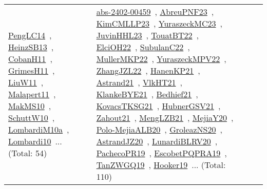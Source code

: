 {\begin{longtable}{lp{3cm}>{\raggedright\arraybackslash}p{6cm}>{\raggedright\arraybackslash}p{6cm}>{\raggedright\arraybackslash}p{8cm}}
\href{../works/PengLC14.pdf}{PengLC14}~\cite{PengLC14}, \href{../works/HeinzSB13.pdf}{HeinzSB13}~\cite{HeinzSB13}, \href{../works/CobanH11.pdf}{CobanH11}~\cite{CobanH11}, \href{../works/GrimesH11.pdf}{GrimesH11}~\cite{GrimesH11}, \href{../works/LiuW11.pdf}{LiuW11}~\cite{LiuW11}, \href{../works/Malapert11.pdf}{Malapert11}~\cite{Malapert11}, \href{../works/MakMS10.pdf}{MakMS10}~\cite{MakMS10}, \href{../works/SchuttW10.pdf}{SchuttW10}~\cite{SchuttW10}, \href{../works/LombardiM10a.pdf}{LombardiM10a}~\cite{LombardiM10a}, \href{../works/Lombardi10.pdf}{Lombardi10}~\cite{Lombardi10}... (Total: 54) & \href{../works/abs-2402-00459.pdf}{abs-2402-00459}~\cite{abs-2402-00459}, \href{../works/AbreuPNF23.pdf}{AbreuPNF23}~\cite{AbreuPNF23}, \href{../works/KimCMLLP23.pdf}{KimCMLLP23}~\cite{KimCMLLP23}, \href{../works/YuraszeckMC23.pdf}{YuraszeckMC23}~\cite{YuraszeckMC23}, \href{../works/JuvinHHL23.pdf}{JuvinHHL23}~\cite{JuvinHHL23}, \href{../works/TouatBT22.pdf}{TouatBT22}~\cite{TouatBT22}, \href{../works/ElciOH22.pdf}{ElciOH22}~\cite{ElciOH22}, \href{../works/SubulanC22.pdf}{SubulanC22}~\cite{SubulanC22}, \href{../works/MullerMKP22.pdf}{MullerMKP22}~\cite{MullerMKP22}, \href{../works/YuraszeckMPV22.pdf}{YuraszeckMPV22}~\cite{YuraszeckMPV22}, \href{../works/ZhangJZL22.pdf}{ZhangJZL22}~\cite{ZhangJZL22}, \href{../works/HanenKP21.pdf}{HanenKP21}~\cite{HanenKP21}, \href{../works/Astrand21.pdf}{Astrand21}~\cite{Astrand21}, \href{../works/VlkHT21.pdf}{VlkHT21}~\cite{VlkHT21}, \href{../works/KlankeBYE21.pdf}{KlankeBYE21}~\cite{KlankeBYE21}, \href{../works/Bedhief21.pdf}{Bedhief21}~\cite{Bedhief21}, \href{../works/KovacsTKSG21.pdf}{KovacsTKSG21}~\cite{KovacsTKSG21}, \href{../works/HubnerGSV21.pdf}{HubnerGSV21}~\cite{HubnerGSV21}, \href{../works/Zahout21.pdf}{Zahout21}~\cite{Zahout21}, \href{../works/MengLZB21.pdf}{MengLZB21}~\cite{MengLZB21}, \href{../works/MejiaY20.pdf}{MejiaY20}~\cite{MejiaY20}, \href{../works/Polo-MejiaALB20.pdf}{Polo-MejiaALB20}~\cite{Polo-MejiaALB20}, \href{../works/GroleazNS20.pdf}{GroleazNS20}~\cite{GroleazNS20}, \href{../works/AstrandJZ20.pdf}{AstrandJZ20}~\cite{AstrandJZ20}, \href{../works/LunardiBLRV20.pdf}{LunardiBLRV20}~\cite{LunardiBLRV20}, \href{../works/PachecoPR19.pdf}{PachecoPR19}~\cite{PachecoPR19}, \href{../works/EscobetPQPRA19.pdf}{EscobetPQPRA19}~\cite{EscobetPQPRA19}, \href{../works/TanZWGQ19.pdf}{TanZWGQ19}~\cite{TanZWGQ19}, \href{../works/Hooker19.pdf}{Hooker19}~\cite{Hooker19}... (Total: 110)\\

\end{longtable}}
